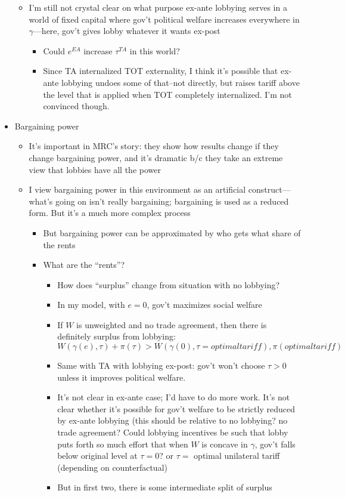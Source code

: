 \documentclass[12pt]{article}
\newcommand{\ga}{\gamma}
\begin{document}
\begin{itemize}
\begin{itemize}
			\item I'm still not crystal clear on what purpose ex-ante lobbying serves in a world of fixed capital where gov't political welfare increases everywhere in $\ga$---here, gov't gives lobby whatever it wants ex-post
				\begin{itemize}
					\item Could $e^{EA}$ increase $\tau^{TA}$ in this world?
					\item Since TA internalized TOT externality, I think it's possible that ex-ante lobbying undoes some of that--not directly, but raises tariff above the level that is applied when TOT completely internalized. I'm not convinced though.
				\end{itemize}
		\end{itemize}
	\item Bargaining power
		\begin{itemize}
			\item It's important in MRC's story: they show how results change if they change bargaining power, and it's dramatic b/c they take an extreme view that lobbies have all the power
			\item I view bargaining power in this environment as an artificial construct---what's going on isn't really bargaining; bargaining is used as a reduced form. But it's a much more complex process
				\begin{itemize}
					\item But bargaining power can be approximated by who gets what share of the rents
					\item What are the ``rents''?
						\begin{itemize}
							\item How does ``surplus'' change from situation with no lobbying?
							\item In my model, with $e=0$, gov't maximizes social welfare
							\item If $W$ is unweighted and no trade agreement, then there is definitely surplus from lobbying:
									\[
									  W(\ga(e),\tau) + \pi(\tau) > W(\ga(0),\tau = optimal tariff ), \pi(optimal tariff)
									\]
							\item Same with TA with lobbying ex-post: gov't won't choose $\tau>0$ unless it improves political welfare.
							\item It's not clear in ex-ante case; I'd have to do more work. It's not clear whether it's possible for gov't welfare to be strictly reduced by ex-ante lobbying (this should be relative to no lobbying? no trade agreement? Could lobbying incentives be such that lobby puts forth so much effort that when $W$ is concave in $\ga$, gov't falls below original level at $\tau = 0$? or $\tau = $ optimal unilateral tariff (depending on counterfactual)
							\item But in first two, there is some intermediate split of surplus
						\end{itemize}
				\end{itemize}
		\end{itemize}
\end{itemize}
\end{document}
